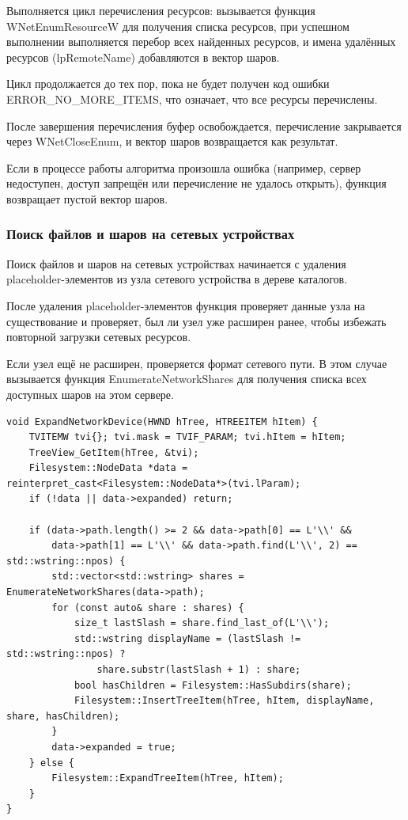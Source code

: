 Выполняется цикл перечисления ресурсов: вызывается функция WNetEnumResourceW для получения списка ресурсов, при успешном выполнении выполняется перебор всех найденных ресурсов, и имена удалённых ресурсов (lpRemoteName) добавляются в вектор шаров.

Цикл продолжается до тех пор, пока не будет получен код ошибки ERROR\_NO\_MORE\_ITEMS, что означает, что все ресурсы перечислены.

После завершения перечисления буфер освобождается, перечисление закрывается через WNetCloseEnum, и вектор шаров возвращается как результат.

Если в процессе работы алгоритма произошла ошибка (например, сервер недоступен, доступ запрещён или перечисление не удалось открыть), функция возвращает пустой вектор шаров.

\subsubsection{Поиск файлов и шаров на сетевых устройствах}

Поиск файлов и шаров на сетевых устройствах начинается с удаления placeholder-элементов из узла сетевого устройства в дереве каталогов.

После удаления placeholder-элементов функция проверяет данные узла на существование и проверяет, был ли узел уже расширен ранее, чтобы избежать повторной загрузки сетевых ресурсов.

Если узел ещё не расширен, проверяется формат сетевого пути. В этом случае вызывается функция EnumerateNetworkShares для получения списка всех доступных шаров на этом сервере.

\begin{lstlisting}[style=CodeListing]
void ExpandNetworkDevice(HWND hTree, HTREEITEM hItem) {
    TVITEMW tvi{}; tvi.mask = TVIF_PARAM; tvi.hItem = hItem; 
    TreeView_GetItem(hTree, &tvi);
    Filesystem::NodeData *data = reinterpret_cast<Filesystem::NodeData*>(tvi.lParam);
    if (!data || data->expanded) return;
    
    if (data->path.length() >= 2 && data->path[0] == L'\\' && 
        data->path[1] == L'\\' && data->path.find(L'\\', 2) == std::wstring::npos) {
        std::vector<std::wstring> shares = EnumerateNetworkShares(data->path);
        for (const auto& share : shares) {
            size_t lastSlash = share.find_last_of(L'\\');
            std::wstring displayName = (lastSlash != std::wstring::npos) ? 
                share.substr(lastSlash + 1) : share;
            bool hasChildren = Filesystem::HasSubdirs(share);
            Filesystem::InsertTreeItem(hTree, hItem, displayName, share, hasChildren);
        }
        data->expanded = true;
    } else {
        Filesystem::ExpandTreeItem(hTree, hItem);
    }
}
\end{lstlisting}

